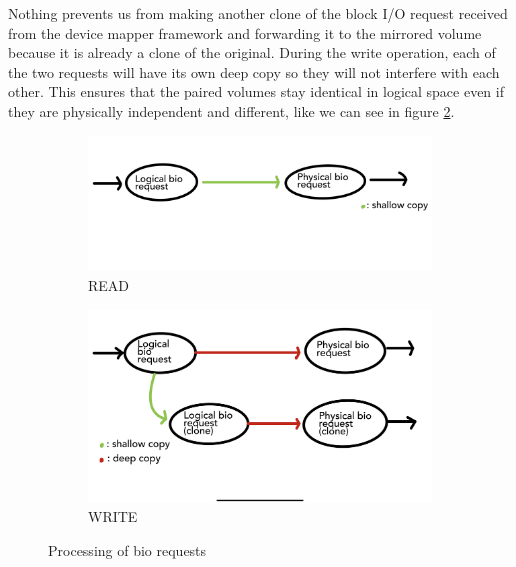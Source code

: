 \documentclass[a4paper,11pt,oneside]{report}
\begin{document}
Nothing prevents us from making another clone of the block I/O request received from the device mapper framework and forwarding it to the mirrored volume because it is already a clone of the original. During the write operation, each of the two requests will have its own deep copy so they will not interfere with each other. This ensures that the paired volumes stay identical in logical space even if they are physically independent and different, like we can see in figure \ref{fig:bio_write}.

\begin{figure}[ht]
     \centering
     \begin{subfigure}[b]{0.49\textwidth}
         \centering
         \includegraphics[width=\textwidth]{Figures/bio_read.png}
         \caption{READ}
         \label{fig:bio_read}
     \end{subfigure}
     \hfill
     \begin{subfigure}[b]{0.49\textwidth}
         \centering
         \includegraphics[width=\textwidth]{Figures/bio_write.png}
         \caption{WRITE}
         \label{fig:bio_write}
     \end{subfigure}
        \caption{Processing of bio requests}
        \label{fig:bio_process}
\end{figure}
\end{document}
